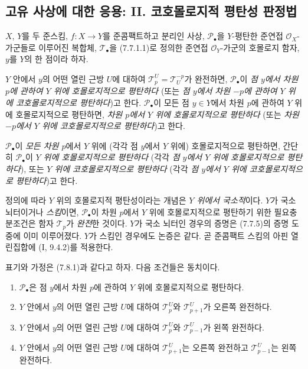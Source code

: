 \subsection{고유 사상에 대한 응용: II. 코호몰로지적 평탄성 판정법}
\label{subsection:III.7.8.fr}

\begin{definition}[7.8.1]
$X$, $Y$를 두 준스킴, $f:X\to Y$를 준콤팩트하고 분리인 사상,
$\mathscr P_\bullet$을 $Y$-평탄한 준연접 $\mathscr O_X$-가군들로 이루어진
복합체, $\mathscr T_\bullet$을 (7.7.1.1)로 정의한 준연접
$\mathscr O_Y$-가군의 호몰로지 함자, $y$를 $Y$의 한 점이라 하자.

$Y$ 안에서 $y$의 어떤 열린 근방 $U$에 대하여
$\mathscr T_p^U=\mathscr T_U^{-p}$가 완전하면, $\mathscr P_\bullet$이
\emph{점 $y$에서 차원 $p$에 관하여 $Y$ 위에 호몰로지적으로 평탄하다}
(또는 \emph{점 $y$에서 차원 $-p$에 관하여 $Y$ 위에 코호몰로지적으로
평탄하다})고 한다. $\mathscr P_\bullet$이 모든 점 $y\in Y$에서 차원
$p$에 관하여 $Y$ 위에 호몰로지적으로 평탄하면,
\emph{차원 $p$에서 $Y$ 위에 호몰로지적으로
평탄하다} (또는 \emph{차원 $-p$에서 $Y$ 위에 코호몰로지적으로
평탄하다})고 한다.

$\mathscr P_\bullet$이 \emph{모든 차원 $p$}에서 $Y$ 위에 (각각 점
$y$에서 $Y$ 위에) 호몰로지적으로 평탄하면, 간단히
$\mathscr P_\bullet$이 \emph{$Y$ 위에 호몰로지적으로 평탄하다}
(각각 \emph{점 $y$에서 $Y$ 위에 호몰로지적으로 평탄하다}), 또는
\emph{$Y$ 위에 코호몰로지적으로 평탄하다} (각각 \emph{점 $y$에서
$Y$ 위에 코호몰로지적으로 평탄하다})고 한다.
\end{definition}

\begin{env}[7.8.2]
정의에 따라 $Y$ 위의 호몰로지적 평탄성이라는 개념은 \emph{$Y$ 위에서
국소적}이다. $Y$가 국소 뇌터이거나 \emph{스킴}이면,
$\mathscr P_\bullet$이 차원 $p$에서 $Y$ 위에 호몰로지적으로 평탄하기
위한 필요충분조건은 함자 $\mathscr T_p$가 \emph{완전}한 것이다.
$Y$가 국소 뇌터인 경우의 증명은 (7.7.5)의 증명 도중에 이미
이루어졌다. $Y$가 스킴인 경우에도 논증은 같다. 곧 준콤팩트 스킴의
아핀 열린집합에 (I, 9.4.2)를 적용한다.
\end{env}

\begin{proposition}[7.8.3]
표기와 가정은 (7.8.1)과 같다고 하자. 다음 조건들은 동치이다.
\begin{enumerate}
  \item[a)] $\mathscr P_\bullet$은 점 $y$에서 차원 $p$에 관하여 $Y$
    위에 호몰로지적으로 평탄하다.
  \item[b)] $Y$ 안에서 $y$의 어떤 열린 근방 $U$에 대하여
    $\mathscr T_p^U$와 $\mathscr T_{p+1}^U$가 오른쪽 완전하다.
  \item[c)] $Y$ 안에서 $y$의 어떤 열린 근방 $U$에 대하여
    $\mathscr T_p^U$와 $\mathscr T_{p-1}^U$가 왼쪽 완전하다.
  \item[d)] $Y$ 안에서 $y$의 어떤 열린 근방 $U$에 대하여
    $\mathscr T_{p+1}^U$는 오른쪽 완전하고 $\mathscr T_{p-1}^U$는
    왼쪽 완전하다.
\end{enumerate}
\end{proposition}

